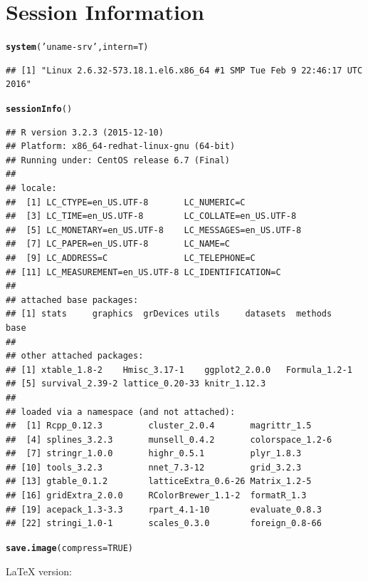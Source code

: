 \documentclass[8pt]{beamer}\usepackage[]{graphicx}\usepackage[]{color}
\makeatletter
\newcommand{\hlnum}[1]{\textcolor[rgb]{0.686,0.059,0.569}{#1}}%
\newcommand{\hlstr}[1]{\textcolor[rgb]{0.192,0.494,0.8}{#1}}%
\newcommand{\hlstd}[1]{\textcolor[rgb]{0.345,0.345,0.345}{#1}}%
\newcommand{\hlkwc}[1]{\textcolor[rgb]{0.333,0.667,0.333}{#1}}%
\newcommand{\hlkwd}[1]{\textcolor[rgb]{0.737,0.353,0.396}{\textbf{#1}}}%
\newenvironment{kframe}{%
 \def\at@end@of@kframe{}%
 \ifinner\ifhmode%
  \def\at@end@of@kframe{\end{minipage}}%
  \begin{minipage}{\columnwidth}%
 \fi\fi%
 \def\FrameCommand##1{\hskip\@totalleftmargin \hskip-\fboxsep
 \colorbox{shadecolor}{##1}\hskip-\fboxsep
     \hskip-\linewidth \hskip-\@totalleftmargin \hskip\columnwidth}%
 \MakeFramed {\advance\hsize-\width
   \@totalleftmargin\z@ \linewidth\hsize
   \@setminipage}}%
 {\par\unskip\endMakeFramed%
 \at@end@of@kframe}
\newenvironment{knitrout}{}{} %
\makeatother
\begin{document}
\section{Session Information}
\begin{knitrout}\footnotesize
{}\color{fgcolor}\begin{kframe}
\begin{alltt}
\hlkwd{system}\hlstd{(}\hlstr{'uname -srv'}\hlstd{,}\hlkwc{intern}\hlstd{=T)}
\end{alltt}
\begin{verbatim}
## [1] "Linux 2.6.32-573.18.1.el6.x86_64 #1 SMP Tue Feb 9 22:46:17 UTC 2016"
\end{verbatim}
\begin{alltt}
\hlkwd{sessionInfo}\hlstd{()}
\end{alltt}
\begin{verbatim}
## R version 3.2.3 (2015-12-10)
## Platform: x86_64-redhat-linux-gnu (64-bit)
## Running under: CentOS release 6.7 (Final)
## 
## locale:
##  [1] LC_CTYPE=en_US.UTF-8       LC_NUMERIC=C              
##  [3] LC_TIME=en_US.UTF-8        LC_COLLATE=en_US.UTF-8    
##  [5] LC_MONETARY=en_US.UTF-8    LC_MESSAGES=en_US.UTF-8   
##  [7] LC_PAPER=en_US.UTF-8       LC_NAME=C                 
##  [9] LC_ADDRESS=C               LC_TELEPHONE=C            
## [11] LC_MEASUREMENT=en_US.UTF-8 LC_IDENTIFICATION=C       
## 
## attached base packages:
## [1] stats     graphics  grDevices utils     datasets  methods   base     
## 
## other attached packages:
## [1] xtable_1.8-2    Hmisc_3.17-1    ggplot2_2.0.0   Formula_1.2-1  
## [5] survival_2.39-2 lattice_0.20-33 knitr_1.12.3   
## 
## loaded via a namespace (and not attached):
##  [1] Rcpp_0.12.3         cluster_2.0.4       magrittr_1.5       
##  [4] splines_3.2.3       munsell_0.4.2       colorspace_1.2-6   
##  [7] stringr_1.0.0       highr_0.5.1         plyr_1.8.3         
## [10] tools_3.2.3         nnet_7.3-12         grid_3.2.3         
## [13] gtable_0.1.2        latticeExtra_0.6-26 Matrix_1.2-5       
## [16] gridExtra_2.0.0     RColorBrewer_1.1-2  formatR_1.3        
## [19] acepack_1.3-3.3     rpart_4.1-10        evaluate_0.8.3     
## [22] stringi_1.0-1       scales_0.3.0        foreign_0.8-66
\end{verbatim}
\begin{alltt}
\hlkwd{save.image}\hlstd{(}\hlkwc{compress} \hlstd{=} \hlnum{TRUE}\hlstd{)}
\end{alltt}
\end{kframe}
\end{knitrout}
\LaTeX{} version: \LaTeXe~ \fmtversion
\end{document}
